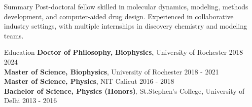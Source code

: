 \documentclass{resume} %
\begin{document}

\begin{rSection}{Summary}
   Post-doctoral fellow skilled in molecular dynamics, modeling, methods development, and computer-aided drug design. Experienced in collaborative industry settings, with multiple internships in discovery chemistry and modeling teams.
\end{rSection}


\begin{rSection}{Education}
   {\bf Doctor of Philosophy, Biophysics}, University of Rochester  \hfill {2018 - 2024}\\
   {\bf Master of Science, Biophysics}, University of Rochester \hfill {2018 - 2021}\\
   {\bf Master of Science, Physics}, NIT Calicut \hfill {2016 - 2018}\\
   {\bf Bachelor of Science, Physics (Honors)}, St.Stephen's College, University of Delhi \hfill {2013 - 2016}

\end{rSection}

\end{document}
